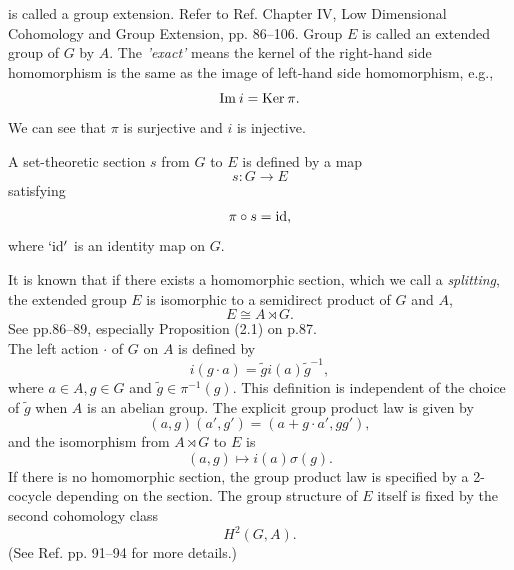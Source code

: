 \documentclass[12pt]{iopart}
\begin{document}
\noindent
is called a group extension.
Refer to Ref.\cite{Brown} Chapter IV, Low Dimensional Cohomology and Group Extension, pp. 86--106.
Group \(E\) is called an extended group of \(G\) by \(A\).
The {\it 'exact'} means the kernel of the right-hand side homomorphism is the same
as the image of left-hand side homomorphism, e.g.,
\begin{equation}
{\rm Im}\:i={\rm Ker}\:\pi.
\end{equation}
We can see that \(\pi\) is surjective and \(i\) is injective.

A set-theoretic section \(s\) from \(G\) to \(E\) is defined by a map
\begin{equation}
s:G\longrightarrow E
\end{equation}
satisfying
\begin{equation}
\pi\circ s={\rm id},
\end{equation}
where \({\rm `id'}\) is an identity map on \(G\).

It is known that
if there exists a homomorphic section, which we call a {\it splitting}, 
the extended group \(E\) is isomorphic to a semidirect product of \(G\) and \(A\),
\begin{equation}
E\cong A\rtimes G.
\end{equation}
See \cite{Brown} pp.86--89, especially Proposition (2.1) on p.87. \\

The left action \(\cdot\) of \(G\) on \(A\) is defined by
\begin{equation}
i(g\cdot a)=\tilde gi(a)\tilde g^{-1},
\end{equation}
where \(a\in A, g\in G\) and \(\tilde g\in\pi^{-1}(g)\).
This definition is independent of the choice of \(\tilde g\)
when \(A\) is an abelian group.
The explicit group product law is given by
\begin{equation}
(a,g)(a',g')=(a+g\cdot a',gg'),
\end{equation}
and the isomorphism from \(A\rtimes G\) to \(E\) is
\begin{equation}
(a,g)\mapsto i(a)\sigma(g).
\end{equation}
If there is no homomorphic section, the group product law is specified by
a 2-cocycle depending on the section.
The group structure of \(E\) itself is fixed by the second cohomology class
\begin{equation}
H^2(G,A).
\end{equation}
(See Ref.\cite{Brown} pp. 91--94 for more details.)
\end{document}

